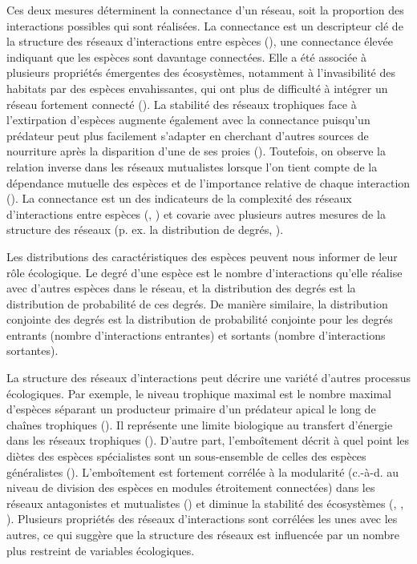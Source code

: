 Ces deux mesures déterminent la connectance d'un réseau, soit la proportion des
interactions possibles qui sont réalisées. La connectance est un descripteur clé
de la structure des réseaux d'interactions entre espèces
(\cite{Martinez1992Constant}), une connectance élevée indiquant que les espèces
sont davantage connectées. Elle a été associée à plusieurs propriétés émergentes
des écosystèmes, notamment à l'invasibilité des habitats par des espèces
envahissantes, qui ont plus de difficulté à intégrer un réseau fortement
connecté (\cite{Smith-Ramesh2017Global}). La stabilité des réseaux trophiques
face à l'extirpation d'espèces augmente également avec la connectance puisqu'un
prédateur peut plus facilement s'adapter en cherchant d'autres sources de
nourriture après la disparition d'une de ses proies (\cite{Dunne2002Network}).
Toutefois, on observe la relation inverse dans les réseaux mutualistes lorsque
l'on tient compte de la dépendance mutuelle des espèces et de l'importance
relative de chaque interaction (\cite{Vieira2015Simple}). La connectance est un
des indicateurs de la complexité des réseaux d'interactions entre espèces
(\cite{Landi2018Complexity}, \cite{Strydom2021Svd}) et covarie avec plusieurs
autres mesures de la structure des réseaux (p. ex. la distribution de degrés,
\cite{Poisot2014When}).

Les distributions des caractéristiques des espèces peuvent nous informer de 
leur rôle écologique. Le degré d'une espèce est le nombre d'interactions qu'elle réalise avec d'autres
espèces dans le réseau, et la distribution des degrés est la distribution de
probabilité de ces degrés. De manière similaire, la distribution conjointe des
degrés est la distribution de probabilité conjointe pour les degrés entrants
(nombre d'interactions entrantes) et sortants (nombre d'interactions sortantes).

La structure des réseaux d'interactions peut décrire une variété d'autres
processus écologiques. Par exemple, le niveau trophique maximal est le nombre
maximal d'espèces séparant un producteur primaire d'un prédateur apical le long
de chaînes trophiques (\cite{Cohen1978Food}). Il représente une limite
biologique au transfert d'énergie dans les réseaux trophiques
(\cite{Williams2004Limits}). D'autre part, l'emboîtement décrit à quel point les
diètes des espèces spécialistes sont un sous-ensemble de celles des espèces
généralistes (\cite{Staniczenko2013Ghost}). L'emboîtement est fortement corrélée
à la modularité (c.-à-d. au niveau de division des espèces en modules
étroitement connectées) dans les réseaux antagonistes et mutualistes
(\cite{Fortuna2010Nestedness}) et diminue la stabilité des écosystèmes
(\cite{Okuyama2008Network}, \cite{Bastolla2009Architecture},
\cite{Thebault2010Stability}). Plusieurs propriétés des réseaux d'interactions
sont corrélées les unes avec les autres, ce qui suggère que la structure des
réseaux est influencée par un nombre plus restreint de variables écologiques.

